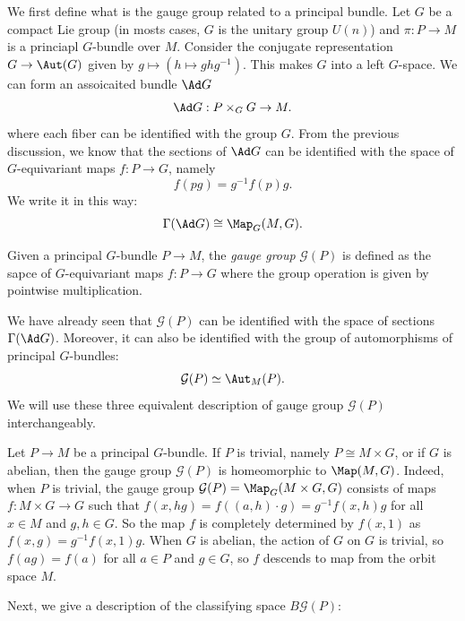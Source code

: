 We first define what is the gauge group related to a principal bundle. Let \(G\) be a compact Lie group (in mosts cases, \(G\) is the unitary group \(U(n)\)) and \(\pi:P\rightarrow M\) is a princiapl \(G\)-bundle over \(M\). Consider the conjugate representation \(G\rightarrow \Aut(G)\) given by \(g\mapsto (h\mapsto ghg^{-1})\). This makes \(G\) into a left \(G\)-space. We can form an assoicaited bundle \(\Ad G\)
\[\Ad G:P\times_G G\rightarrow M.\]
where each fiber can be identified with the group \(G\). From the previous discussion, we know that the sections of \(\Ad G\) can be identified with the space of \(G\)-equivariant maps \(f:P\rightarrow G\), namely 
\[f(pg)=g^{-1}f(p)g.\]
We write it in this way:
\[\Gamma(\Ad G)\cong \Map_G(M,G).\]
\begin{definition}
     Given a principal \(G\)-bundle \(P\rightarrow M\), the \textit{gauge group} \(\mathcal{G}(P)\) is defined as the sapce of \(G\)-equivariant maps \(f:P\rightarrow G\) where the group operation is given by pointwise multiplication. 
\end{definition}

\begin{remark}
     We have already seen that \(\mathcal{G}(P)\) can be identified with the space of sections \(\Gamma(\Ad G)\). Moreover, it can also be identified with the group of automorphisms of principal \(G\)-bundles:
     \[\mathcal{G}(P)\simeq \Aut_M(P).\]
     We will use these three equivalent description of gauge group \(\mathcal{G}(P)\) interchangeably.
\end{remark}

\begin{example}
    Let \(P\rightarrow M\) be a principal \(G\)-bundle. If \(P\) is trivial, namely \(P\cong M\times G\), or if \(G\) is abelian, then the gauge group \(\mathcal{G}(P)\) is homeomorphic to \(\Map(M,G)\). Indeed, when \(P\) is trivial, the gauge group \(\mathcal{G}(P)=\Map_G(M\times G, G)\) consists of maps \(f:M\times G\rightarrow G\) such that \(f(x,hg)=f((a,h)\cdot g)=g^{-1}f(x,h)g\) for all \(x\in M\) and \(g,h\in G\). So the map \(f\) is completely determined by \(f(x,1)\) as \(f(x,g)=g^{-1}f(x,1)g\). When \(G\) is abelian, the action of \(G\) on \(G\) is trivial, so \(f(ag)=f(a)\) for all \(a\in P\) and \(g\in G\), so \(f\) descends to map from the orbit space \(M\).  
\end{example}

Next, we give a description of the classifying space \(B \mathcal{G}(P)\):

